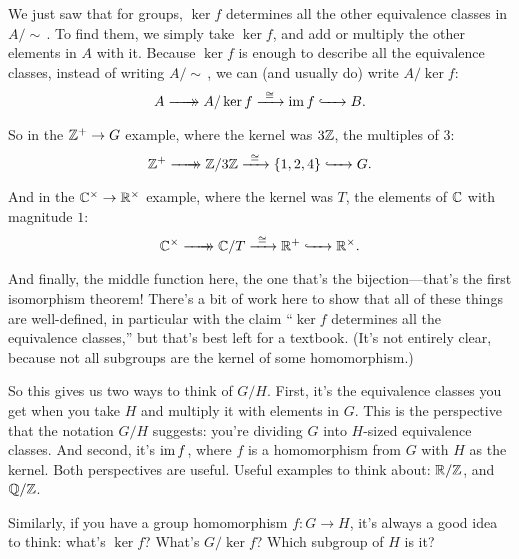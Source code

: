 \documentclass[11pt,paper=letter]{scrartcl}
\newcommand{\xrightarrowdbl}[2][]{%
  \xrightarrow[#1]{#2}\mathrel{\mkern-14mu}\rightarrow
}
\newcommand{\simm}{\!\sim\,}
\begin{document}
We just saw that for groups, $\ker f$ determines all the other equivalence classes in $A/\simm$. To find them, we simply take $\ker f$, and add or multiply the other elements in $A$ with it. Because $\ker f$ is enough to describe all the equivalence classes, instead of writing $A/\simm$, we can (and usually do) write $A/\ker f$:
\[
A \xrightarrowdbl{\phantom{xxx}} A/\ker f
\xrightarrow[\phantom{xxx}]{\cong} \im f
\xhookrightarrow{\phantom{xxx}} B.
\]
So in the $\mathbb Z^+ \to G$ example, where the kernel was $3\mathbb Z$, the multiples of $3$:
\[
\ZZ^+ \xrightarrowdbl{\phantom{xxx}} \ZZ/3\ZZ
\xrightarrow[\phantom{xxx}]{\cong} \{1, 2, 4\}
\xhookrightarrow{\phantom{xxx}} G.
\]
And in the $\mathbb C^\times \to \mathbb R^\times$ example, where the kernel was $T$, the elements of $\mathbb C$ with magnitude $1$:
\[
\CC^\times \xrightarrowdbl{\phantom{xxx}} \CC/T
\xrightarrow[\phantom{xxx}]{\cong} \RR^+
\xhookrightarrow{\phantom{xxx}} \RR^\times.
\]
And finally, the middle function here, the one that's the bijection---that's the first isomorphism theorem! There's a bit of work here to show that all of these things are well-defined, in particular with the claim ``$\ker f$ determines all the equivalence classes,'' but that's best left for a textbook. (It's not entirely clear, because not all subgroups are the kernel of some homomorphism.)

So this gives us two ways to think of $G/H$. First, it's the equivalence classes you get when you take $H$ and multiply it with elements in $G$. This is the perspective that the notation $G/H$ suggests: you're dividing $G$ into $H$-sized equivalence classes. And second, it's $\operatorname{im} f$, where $f$ is a homomorphism from $G$ with $H$ as the kernel. Both perspectives are useful. Useful examples to think about: $\mathbb R/\mathbb Z$, and $\mathbb Q/\mathbb Z$.

Similarly, if you have a group homomorphism $f : G \to H$, it's always a good idea to think: what's $\ker f$? What's $G/\ker f$? Which subgroup of $H$ is it?
\end{document}
